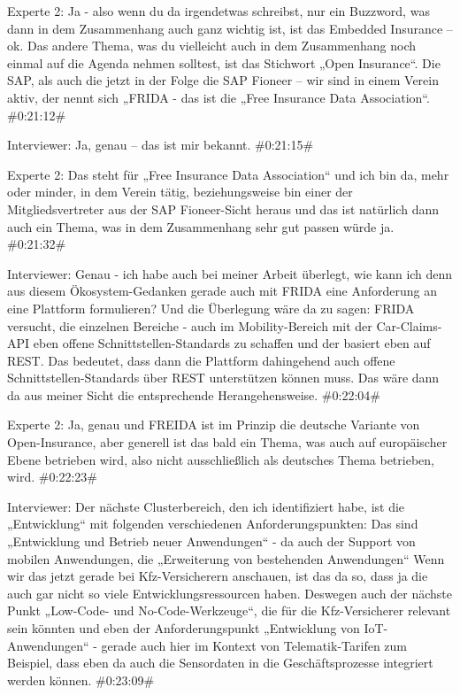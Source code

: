 Experte 2:
Ja - also wenn du da irgendetwas schreibst, nur ein Buzzword, was dann in dem Zusammenhang auch ganz wichtig ist, ist das Embedded Insurance – ok. Das andere Thema, was du vielleicht auch in dem Zusammenhang noch einmal auf die Agenda nehmen solltest, ist das Stichwort „Open Insurance“. Die SAP, als auch die jetzt in der Folge die SAP Fioneer – wir sind in einem Verein aktiv, der nennt sich „FRIDA - das ist die „Free Insurance Data Association“.
\#0:21:12\#

Interviewer:
Ja, genau – das ist mir bekannt.
\#0:21:15\#

Experte 2:
Das steht für „Free Insurance Data Association“ und ich bin da, mehr oder minder, in dem Verein tätig, beziehungsweise bin einer der Mitgliedsvertreter aus der SAP Fioneer-Sicht heraus und das ist natürlich dann auch ein Thema, was in dem Zusammenhang sehr gut passen würde ja.
\#0:21:32\#

Interviewer:
Genau - ich habe auch bei meiner Arbeit überlegt, wie kann ich denn aus diesem Ökosystem-Gedanken gerade auch mit FRIDA eine Anforderung an eine Plattform formulieren? Und die Überlegung wäre da zu sagen: FRIDA versucht, die einzelnen Bereiche - auch im Mobility-Bereich mit der Car-Claims-API eben offene Schnittstellen-Standards zu schaffen und der basiert eben auf REST. Das bedeutet, dass dann die Plattform dahingehend auch offene Schnittstellen-Standards über REST unterstützen können muss. Das wäre dann da aus meiner Sicht die entsprechende Herangehensweise.
\#0:22:04\#

Experte 2:
Ja, genau und FREIDA ist im Prinzip die deutsche Variante von Open-Insurance, aber generell ist das bald ein Thema, was auch auf europäischer Ebene betrieben wird, also nicht ausschließlich als deutsches Thema betrieben, wird. 
\#0:22:23\#

Interviewer:
Der nächste Clusterbereich, den ich identifiziert habe, ist die „Entwicklung“ mit folgenden verschiedenen Anforderungspunkten: Das sind „Entwicklung und Betrieb neuer Anwendungen“ - da auch der Support von mobilen Anwendungen, die „Erweiterung von bestehenden Anwendungen“ Wenn wir das jetzt gerade bei Kfz-Versicherern anschauen, ist das da so, dass ja die auch gar nicht so viele Entwicklungsressourcen haben. Deswegen auch der nächste Punkt „Low-Code- und No-Code-Werkzeuge“, die für die Kfz-Versicherer relevant sein könnten und eben der Anforderungspunkt „Entwicklung von IoT-Anwendungen“ - gerade auch hier im Kontext von Telematik-Tarifen zum Beispiel, dass eben da auch die Sensordaten in die Geschäftsprozesse integriert werden können.
\#0:23:09\#

